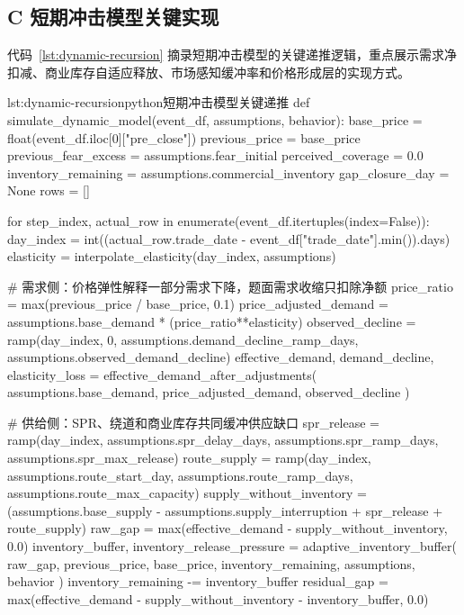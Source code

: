 \clearpage

\subsection*{C 短期冲击模型关键实现}

代码~\ref{lst:dynamic-recursion} 摘录短期冲击模型的关键递推逻辑，重点展示需求净扣减、商业库存自适应释放、市场感知缓冲率和价格形成层的实现方式。

\begin{paperlisting}{lst:dynamic-recursion}{python}{短期冲击模型关键递推}
def simulate_dynamic_model(event_df, assumptions, behavior):
    base_price = float(event_df.iloc[0]["pre_close"])
    previous_price = base_price
    previous_fear_excess = assumptions.fear_initial
    perceived_coverage = 0.0
    inventory_remaining = assumptions.commercial_inventory
    gap_closure_day = None
    rows = []

    for step_index, actual_row in enumerate(event_df.itertuples(index=False)):
        day_index = int((actual_row.trade_date - event_df["trade_date"].min()).days)
        elasticity = interpolate_elasticity(day_index, assumptions)

        # 需求侧：价格弹性解释一部分需求下降，题面需求收缩只扣除净额
        price_ratio = max(previous_price / base_price, 0.1)
        price_adjusted_demand = assumptions.base_demand * (price_ratio**elasticity)
        observed_decline = ramp(day_index, 0, assumptions.demand_decline_ramp_days,
                                assumptions.observed_demand_decline)
        effective_demand, demand_decline, elasticity_loss = effective_demand_after_adjustments(
            assumptions.base_demand, price_adjusted_demand, observed_decline
        )

        # 供给侧：SPR、绕道和商业库存共同缓冲供应缺口
        spr_release = ramp(day_index, assumptions.spr_delay_days,
                           assumptions.spr_ramp_days, assumptions.spr_max_release)
        route_supply = ramp(day_index, assumptions.route_start_day,
                            assumptions.route_ramp_days, assumptions.route_max_capacity)
        supply_without_inventory = (assumptions.base_supply - assumptions.supply_interruption
                                    + spr_release + route_supply)
        raw_gap = max(effective_demand - supply_without_inventory, 0.0)
        inventory_buffer, inventory_release_pressure = adaptive_inventory_buffer(
            raw_gap, previous_price, base_price, inventory_remaining, assumptions, behavior
        )
        inventory_remaining -= inventory_buffer
        residual_gap = max(effective_demand - supply_without_inventory - inventory_buffer, 0.0)


\end{paperlisting}
